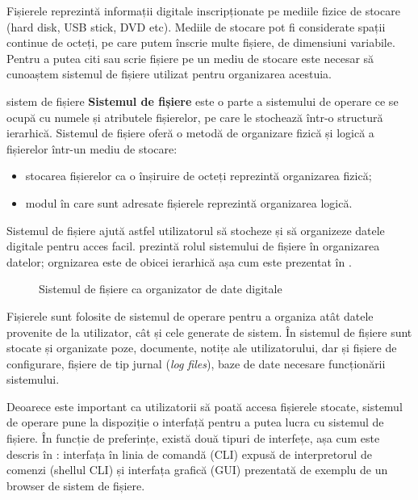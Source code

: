 Fișierele reprezintă informații digitale inscripționate pe mediile fizice de stocare (hard disk, USB stick, DVD etc).
Mediile de stocare pot fi considerate spații continue de octeți, pe care putem înscrie multe fișiere, de dimensiuni variabile.
Pentru a putea citi sau scrie fișiere pe un mediu de stocare este necesar să cunoaștem sistemul de fișiere utilizat pentru organizarea acestuia.

\begin{definition}{sistem de fișiere}
\textbf{Sistemul de fișiere} este o parte a sistemului de operare ce se ocupă cu numele și atributele fișierelor, pe care le stochează într-o structură ierarhică.
Sistemul de fișiere oferă o metodă de organizare fizică și logică a fișierelor într-un mediu de stocare:

\begin{itemize}
  \item stocarea fișierelor ca o înșiruire de octeți reprezintă organizarea fizică;
  \item modul în care sunt adresate fișierele reprezintă organizarea logică.
\end{itemize}
\end{definition}

Sistemul de fișiere ajută astfel utilizatorul să stocheze și să organizeze datele digitale pentru acces facil.
 prezintă rolul sistemului de fișiere în organizarea datelor;
orgnizarea este de obicei ierarhică așa cum este prezentat în .

\begin{figure}[htbp]
  \centering
  \def\svgwidth{0.5\columnwidth}
  
  \caption{Sistemul de fișiere ca organizator de date digitale}
  \label{fig:fs:def-fs}
\end{figure}

Fișierele sunt folosite de sistemul de operare pentru a organiza atât datele provenite de la utilizator, cât și cele generate de sistem.
În sistemul de fișiere sunt stocate și organizate poze, documente, notițe ale utilizatorului, dar și fișiere de configurare, fișiere de tip jurnal (\textit{log files}), baze de date necesare funcționării sistemului.

Deoarece este important ca utilizatorii să poată accesa fișierele stocate, sistemul de operare pune la dispoziție o interfață pentru a putea lucra cu sistemul de fișiere.
În funcție de preferințe, există două tipuri de interfețe, așa cum este descris în : interfața în linia de comandă (CLI) expusă de interpretorul de comenzi (shellul CLI) și interfața grafică (GUI) prezentată de exemplu de un browser de sistem de fișiere.

